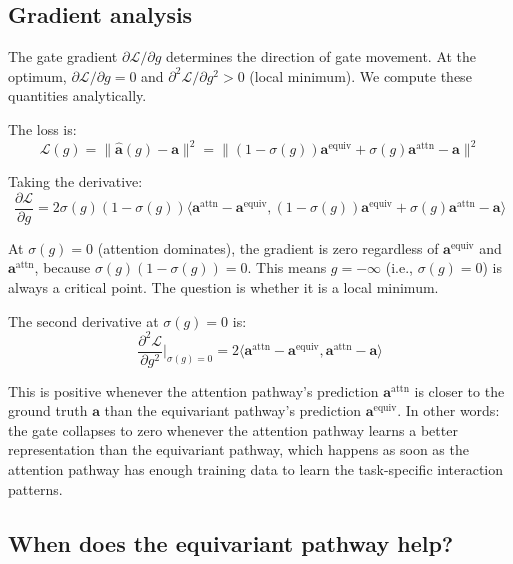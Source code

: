 \documentclass[10pt,twocolumn]{article}
\begin{document}
\subsection{Gradient analysis}

The gate gradient $\partial \mathcal{L} / \partial g$ determines the direction of gate movement. At the optimum, $\partial \mathcal{L} / \partial g = 0$ and $\partial^2 \mathcal{L} / \partial g^2 > 0$ (local minimum). We compute these quantities analytically.

The loss is:
\begin{equation}
    \mathcal{L}(g) = \|\hat{\mathbf{a}}(g) - \mathbf{a}\|^2 = \|(1-\sigma(g))\mathbf{a}^{\text{equiv}} + \sigma(g)\mathbf{a}^{\text{attn}} - \mathbf{a}\|^2
\end{equation}

Taking the derivative:
\begin{equation}
    \frac{\partial \mathcal{L}}{\partial g} = 2\sigma(g)(1-\sigma(g))\langle \mathbf{a}^{\text{attn}} - \mathbf{a}^{\text{equiv}}, (1-\sigma(g))\mathbf{a}^{\text{equiv}} + \sigma(g)\mathbf{a}^{\text{attn}} - \mathbf{a}\rangle
\end{equation}

At $\sigma(g) = 0$ (attention dominates), the gradient is zero regardless of $\mathbf{a}^{\text{equiv}}$ and $\mathbf{a}^{\text{attn}}$, because $\sigma(g)(1-\sigma(g)) = 0$. This means $g = -\infty$ (i.e., $\sigma(g) = 0$) is always a critical point. The question is whether it is a local minimum.

The second derivative at $\sigma(g) = 0$ is:
\begin{equation}
    \frac{\partial^2 \mathcal{L}}{\partial g^2}\bigg|_{\sigma(g)=0} = 2\langle \mathbf{a}^{\text{attn}} - \mathbf{a}^{\text{equiv}}, \mathbf{a}^{\text{attn}} - \mathbf{a}\rangle
\end{equation}

This is positive whenever the attention pathway's prediction $\mathbf{a}^{\text{attn}}$ is closer to the ground truth $\mathbf{a}$ than the equivariant pathway's prediction $\mathbf{a}^{\text{equiv}}$. In other words: the gate collapses to zero whenever the attention pathway learns a better representation than the equivariant pathway, which happens as soon as the attention pathway has enough training data to learn the task-specific interaction patterns.

\subsection{When does the equivariant pathway help?}
\end{document}
